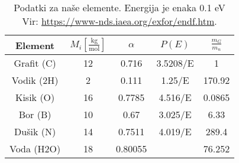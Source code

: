\documentclass[slovene,11pt,a4paper]{article}
\begin{document}
\begin{table}[h!]
\centering
 \begin{tabular}{|c | c | c | c | c|} 
 \hline
 Element & $M_i \left[\frac{\text{kg}}{\text{mol}}\right]$ &  $\alpha $ & $ P(E)$ &$\frac{m_G}{m_n}$ \\
 \hline
 Grafit (C) & 12&  0.716 &3.5208/E & 1 \\
 \hline
 Vodik (2H) & 2 &  0.111& 1.25/E & 170.92\\
 \hline
 Kisik (O) & 16 &  0.7785 & 4.516/E  & 0.0865\\
 \hline 
 Bor (B) & 10 & 0.67& 3.025/E & 6.33\\
 \hline
 Dušik (N) & 14 & 0.7511 & 4.019/E & 289.4 \\
 \hline
  Voda (H2O) & 18 & 0.80055 & & 76.252 \\
  \hline
 \end{tabular}
\caption{Podatki za naše elemente. Energija je enaka 0.1 eV Vir: \url{https://www-nds.iaea.org/exfor/endf.htm}.}
\end{table}
\end{document}
